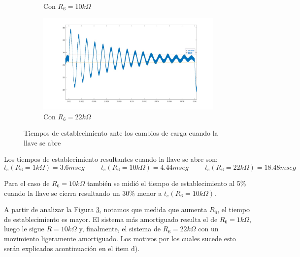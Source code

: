 \documentclass[e4_tp2_main.tex]{subfiles}
\begin{document}
\begin{figure}[H]
\begin{subfigure}[b]{0.3\textwidth}
    \caption{ Con $R_6=10k\Omega$}
    \label{fig:f2}
  \end{subfigure}
  \hfill
  \begin{subfigure}[b]{0.3\textwidth}
    \includegraphics[width=\textwidth, height=\textwidth]{Imagenes/Punto1/Test_con_R6_22k.jpeg}
    \caption{ Con $R_6=22k\Omega$}
    \label{fig:f3}
  \end{subfigure}
  \caption{Tiempos de establecimiento ante los cambios de carga cuando la llave se abre}
  \label{osc}
\end{figure}

Los tiempos de establecimiento resultantes cuando la llave se abre son: 
\hspace{0.1cm}
\begin{equation}
t_e(R_6=1k\Omega)=3.6 mseg
\hspace{1cm}
t_e(R_6=10k\Omega)=4.44 mseg
\hspace{1cm}
t_e(R_6=22k\Omega)=18.48 mseg
\end{equation}

Para el caso de $R_6=10k\Omega$ tambi\'en se midi\'o el tiempo de establecimiento al 5\% cuando la llave se cierra resultando un 30\% menor a $t_e(R_6=10k\Omega)$. 

A partir de analizar la Figura \ref{osc}, notamos que medida que aumenta $R_6$, el tiempo de establecimiento es mayor. El sistema m\'as amortiguado resulta el de $R_6=1k\Omega$, luego le sigue $R=10k\Omega$ y, finalmente, el sistema de $R_6=22k\Omega$ con un movimiento ligeramente amortiguado. Los motivos por los cuales sucede esto ser\'an explicados acontinuaci\'on en el item d).
\end{document}
